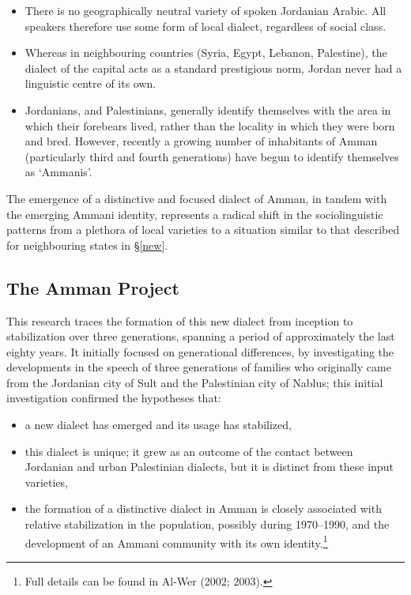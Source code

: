 \documentclass[output=paper]{langsci/langscibook}
\begin{document}
\begin{itemize}
\item 
There is no geographically neutral variety of spoken Jordanian Arabic. All speakers therefore use some form of local dialect, regardless of social class.

\item 
Whereas in neighbouring countries (Syria, Egypt, Lebanon, Palestine), the dialect of the capital acts as a standard prestigious norm, Jordan never had a linguistic centre of its own.

\item 
Jordanians, and Palestinians, generally identify themselves with the area in which their forebears lived, rather than the locality in which they were born and bred. However, recently a growing number of inhabitants of Amman (particularly third and fourth generations) have begun to identify themselves as ‘Ammanis’.

\end{itemize}

The emergence of a distinctive and focused dialect of Amman, in tandem with the emerging Ammani identity, represents a radical shift in the sociolinguistic patterns from a plethora of local varieties to a situation similar to that described for neighbouring states in §\ref{new}.

\subsection{The Amman Project}

This research traces the formation of this new dialect from inception to stabilization over three generations, spanning a period of approximately the last eighty years. It initially focused on generational differences, by investigating the developments in the speech of three generations of families who originally came from the Jordanian city of Sult and the Palestinian city of Nablus; this initial investigation confirmed the hypotheses that:

\begin{itemize}
\item 
a new dialect has emerged and its usage has stabilized,

\item 
this dialect is unique; it grew as an outcome of the contact between Jordanian and urban Palestinian dialects, but it is distinct from these input varieties,

\item 
the formation of a distinctive dialect in Amman is closely associated with relative stabilization in the population, possibly during 1970–1990, and the development of an Ammani community with its own identity.\footnote{Full details can be found in Al-Wer (2002; 2003).}

\end{itemize}
\end{document}
